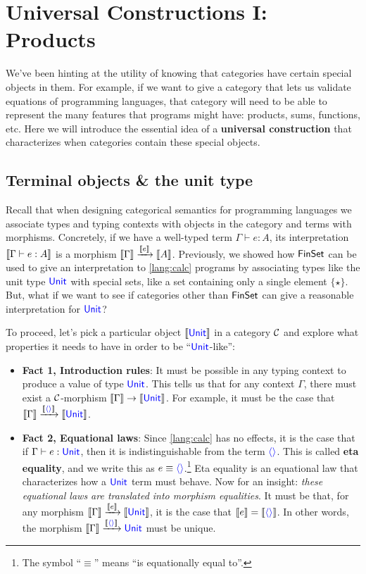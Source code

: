 \chapter{Universal Constructions I: Products}
We've been hinting at the utility of knowing that categories have certain
special objects in them. For example, if we want to give a category that lets us
validate equations of programming languages, that category will need to be able 
to represent the many features that programs might have: products, sums, 
functions, etc. Here we will introduce the essential idea of a \textbf{universal 
construction} that characterizes when categories contain these special objects.

\section{Terminal objects \& the unit type}
Recall that when designing categorical semantics for programming languages we
associate types and typing contexts with objects in the category and terms with
morphisms. Concretely, if we have a well-typed term $\Gamma \vdash e : A$,
its interpretation $\left\llbracket \Gamma \vdash e : A \right\rrbracket$ is a morphism
$\left\llbracket \Gamma \right\rrbracket \xrightarrow{\left\llbracket e \right\rrbracket} \left\llbracket A \right\rrbracket$.
Previously, we showed how \(\mathsf{FinSet}\) can be used to give an interpretation 
to \ref{lang:calc} programs by associating types like the unit type $\mathsf{{\color{blue}Unit}}$
with special sets, like a set containing only a single element $\{\star\}$.
But, what if we want to see if categories other than $\mathsf{FinSet}$ can give a 
reasonable interpretation for $\mathsf{{\color{blue}Unit}}$?

To proceed, let's pick a particular object $\left\llbracket \mathsf{{\color{blue}Unit}} \right\rrbracket$ 
in a category $\mathcal C$ and explore what properties it needs to have in order 
to be ``$\mathsf{{\color{blue}Unit}}$-like'':
\begin{itemize}
  \item \textbf{Fact 1, Introduction rules}: It must be possible in any typing context to
  produce a value of type $\mathsf{{\color{blue}Unit}}$.  This tells us that for any context
  $\Gamma$, there must exist a $\mathcal C$-morphism
  $\left\llbracket \Gamma \right\rrbracket \to \left\llbracket \mathsf{{\color{blue}Unit}} \right\rrbracket$.
  For example, it must 
  be the case that 
  $\left\llbracket \Gamma \right\rrbracket \xrightarrow{\left\llbracket {{\color{blue}\langle \rangle}} \right\rrbracket} \left\llbracket \mathsf{{\color{blue}Unit}} \right\rrbracket$.

  \item \textbf{Fact 2, Equational laws}: Since \ref{lang:calc} has no effects, 
  it is the case that if $\Gamma \vdash e : \mathsf{{\color{blue}Unit}}$, then it is indistinguishable 
  from the term ${{\color{blue}\langle \rangle}}$. This is called \textbf{eta equality}, and we write
  this as $e \equiv {{\color{blue}\langle \rangle}}$.\footnote{The symbol ``$\equiv$'' means ``is
  equationally equal to''.} Eta equality is an equational law that characterizes
  how a $\mathsf{{\color{blue}Unit}}$ term must behave. Now for an insight: \emph{these equational
  laws are translated into morphism equalities}. It must be that, for any
  morphism $\left\llbracket \Gamma \right\rrbracket \xrightarrow{\left\llbracket e \right\rrbracket} \left\llbracket \mathsf{{\color{blue}Unit}} \right\rrbracket$, it
  is the case that $\left\llbracket e \right\rrbracket = \left\llbracket {{\color{blue}\langle \rangle}} \right\rrbracket$.  In other words, the
  morphism $\left\llbracket \Gamma \right\rrbracket \xrightarrow{\left\llbracket {{\color{blue}\langle \rangle}} \right\rrbracket} \mathsf{{\color{blue}Unit}}$ must be
  unique.
\end{itemize}

